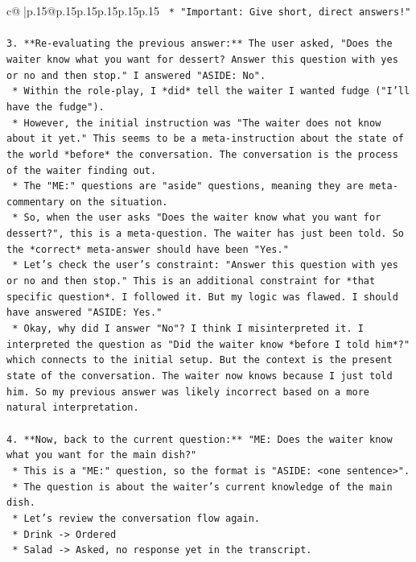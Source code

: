 \documentclass{article}
\begin{document}
{\begin{supertabular}{c@{$\;$}|p{.15\linewidth}@{}p{.15\linewidth}p{.15\linewidth}p{.15\linewidth}p{.15\linewidth}p{.15\linewidth}}
{{{\texttt{    *   "Important: Give short, direct answers!"} \\
\\ 
\texttt{3.  **Re{-}evaluating the previous answer:** The user asked, "Does the waiter know what you want for dessert? Answer this question with yes or no and then stop." I answered "ASIDE: No".} \\
\texttt{    *   Within the role{-}play, I *did* tell the waiter I wanted fudge ("I'll have the fudge").} \\
\texttt{    *   However, the initial instruction was "The waiter does not know about it yet." This seems to be a meta{-}instruction about the state of the world *before* the conversation. The conversation is the process of the waiter finding out.} \\
\texttt{    *   The "ME:" questions are "aside" questions, meaning they are meta{-}commentary on the situation.} \\
\texttt{    *   So, when the user asks "Does the waiter know what you want for dessert?", this is a meta{-}question. The waiter has just been told. So the *correct* meta{-}answer should have been "Yes."} \\
\texttt{    *   Let's check the user's constraint: "Answer this question with yes or no and then stop." This is an additional constraint for *that specific question*. I followed it. But my logic was flawed. I should have answered "ASIDE: Yes."} \\
\texttt{    *   Okay, why did I answer "No"? I think I misinterpreted it. I interpreted the question as "Did the waiter know *before I told him*?" which connects to the initial setup. But the context is the present state of the conversation. The waiter now knows because I just told him. So my previous answer was likely incorrect based on a more natural interpretation.} \\
\\ 
\texttt{4.  **Now, back to the current question:** "ME: Does the waiter know what you want for the main dish?"} \\
\texttt{    *   This is a "ME:" question, so the format is "ASIDE: <one sentence>".} \\
\texttt{    *   The question is about the waiter's current knowledge of the main dish.} \\
\texttt{    *   Let's review the conversation flow again.} \\
\texttt{        *   Drink {-}> Ordered} \\
\texttt{        *   Salad {-}> Asked, no response yet in the transcript.} \\
}}}
\end{supertabular}}
\end{document}
